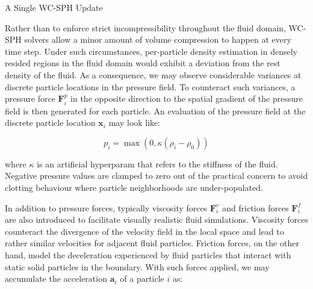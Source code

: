 \documentclass[
	11pt, 
	DIV10,
	ngerman,
	a4paper, 
	oneside, 
	headings=normal, 
	captions=tableheading,
	final, 
	numbers=noenddot
]{scrartcl}
\begin{document}
\medskip
\begin{algorithm}[H]
	\DontPrintSemicolon
	\SetAlgoLined
	\caption{\label{alg1} A Single WC-SPH Update}
\end{algorithm}
\medskip

Rather than to enforce strict incompressibility throughout the fluid domain, WC-SPH solvers allow a minor amount of volume compression to happen at every time step. Under such circumstances, per-particle density estimation in densely resided regions in the fluid domain would exhibit a deviation from the rest density of the fluid. As a consequence, we may observe considerable variances at discrete particle locations in the pressure field. To counteract such variances, a pressure force $ \mathbf{F}_{i}^{p} $ in the opposite direction to the spatial gradient of the pressure field is then generated for each particle. An evaluation of the pressure field at the discrete particle location $ \boldsymbol{x}_{i} $ may look like:

\begin{equation}
	\label{eq14}
    p_{i} = \max(0, \kappa(\rho_{i} - \rho_{0}))
\end{equation}

where $ \kappa $ is an artificial hyperparam that refers to the stiffness of the fluid. Negative pressure values are clamped to zero out of the practical concern to avoid clotting behaviour where particle neighborhoods are under-populated. 

In addition to pressure forces, typically viscosity forces $ \mathbf{F}_{i}^{v} $ and friction forces $ \mathbf{F}_{i}^{f} $ are also introduced to facilitate visually realistic fluid simulations. Viscosity forces counteract the divergence of the velocity field in the local space and lead to rather similar velocities for adjacent fluid particles. Friction forces, on the other hand, model the deceleration experienced by fluid particles that interact with static solid particles in the boundary. With such forces applied, we may accumulate the acceleration $ \boldsymbol{a}_{i} $ of a particle $ i $ as:
\end{document}
